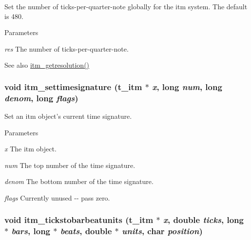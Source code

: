 Set the number of ticks-\/per-\/quarter-\/note globally for the itm system. The default is 480.


\begin{DoxyParams}{Parameters}
\item[{\em res}]The number of ticks-\/per-\/quarter-\/note. \end{DoxyParams}
\begin{DoxySeeAlso}{See also}
\hyperlink{group__time_gaba77c4fbb00c349342b6358d80644113}{itm\_\-getresolution()} 
\end{DoxySeeAlso}
\hypertarget{group__time_gad8584c381f8f183ff6eaa0f4e4a4923a}{
\subsubsection[{itm\_\-settimesignature}]{\setlength{\rightskip}{0pt plus 5cm}void itm\_\-settimesignature ({\bf t\_\-itm} $\ast$ {\em x}, \/  long {\em num}, \/  long {\em denom}, \/  long {\em flags})}}
\label{group__time_gad8584c381f8f183ff6eaa0f4e4a4923a}


Set an itm object's current time signature. 
\begin{DoxyParams}{Parameters}
\item[{\em x}]The itm object. \item[{\em num}]The top number of the time signature. \item[{\em denom}]The bottom number of the time signature. \item[{\em flags}]Currently unused -\/-\/ pass zero. \end{DoxyParams}
\hypertarget{group__time_ga098ba18a9c4a10c3d92445b0bf3da025}{
\subsubsection[{itm\_\-tickstobarbeatunits}]{\setlength{\rightskip}{0pt plus 5cm}void itm\_\-tickstobarbeatunits ({\bf t\_\-itm} $\ast$ {\em x}, \/  double {\em ticks}, \/  long $\ast$ {\em bars}, \/  long $\ast$ {\em beats}, \/  double $\ast$ {\em units}, \/  char {\em position})}}
\label{group__time_ga098ba18a9c4a10c3d92445b0bf3da025}


